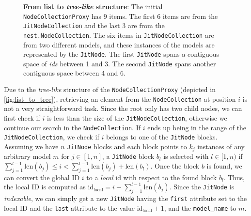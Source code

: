 \begin{figure}[ht!]
{\begin{tikzpicture}[x=0.75pt,y=0.75pt,yscale=-1,xscale=1]
\end{tikzpicture}
}
    \caption{\textbf{From list to \emph{tree-like} structure}: The initial \texttt{NodeCollectionProxy} has 9 items. The first 6 items are from the \texttt{JitNodeCollection} and the last 3 are from the \texttt{nest.NodeCollection}. The six items  in \texttt{JitNodeCollection} are from two different models, and these instances of the models are represented by the \texttt{JitNode}. The first \texttt{JitNode} spans a contiguous space of \emph{ids} between 1 and 3. The second \texttt{JitNode} spans another contiguous space between 4 and 6.}
    \label{fig:list_to_tree}
\end{figure}

Due to the \emph{tree-like} structure of the \texttt{NodeCollectionProxy} (depicted in \autoref{fig:list_to_tree}), retrieving an element from the \texttt{NodeCollection} at position $i$ is not a very straightforward task. Since the root only has two child nodes, we can first check if $i$ is less than the size of the \texttt{JitNodeCollection}, otherwise we continue our search in the \texttt{NodeCollection}. If $i$ ends up being in the range of the \texttt{JitNodeCollection}, we check if $i$ belongs to one of the \texttt{JitNode} blocks. Assuming we have $n$ \texttt{JitNode} blocks and each block points to $k_j$ instances of any arbitrary model $m$ for $j \in [1, n]$, a \texttt{JitNode} block $b_l$ is selected with $l \in [1, n)$ if $\sum_{j=1}^{l-1} \text{len}(b_j) \leq i < \sum_{j=1}^{l-1} \text{len}(b_j) + \text{len}(b_l)$. Once the block $b$ is found, we can convert the global ID $i$ to a \emph{local} id with respect to the found block $b_l$. Thus, the local ID is computed as $\text{id}_\text{local} = i -\sum_{j=1}^{l-1} \text{len}(b_j)$. Since the \texttt{JitNode} is \emph{indexable}, we can simply get a new \texttt{JitNode} having the \texttt{first} attribute set to the local ID and the \texttt{last} attribute to the value $\text{id}_\text{local} + 1$, and the \texttt{model\_name} to $m$.

